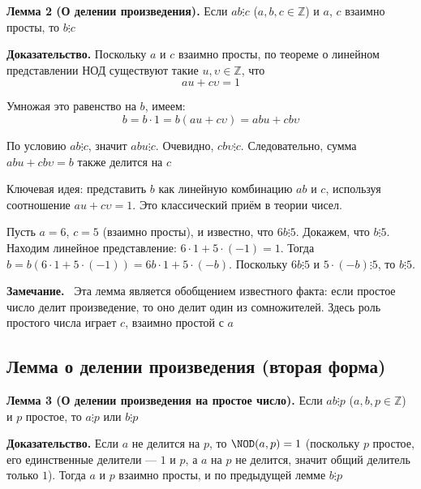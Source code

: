 \documentclass[a4paper,12pt]{article}
\newcommand{\myremark}{\textbf{Замечание.}\ }
\theoremstyle{definition}
\theoremstyle{plain}
\theoremstyle{remark}
\begin{document}
	\noindent \textbf{Лемма 2 (О делении произведения).}
	Если $ab \vdots c$ ($a, b, c \in \mathbb{Z}$) и $a$, $c$ взаимно просты, то $b \vdots c$
	
	\medskip
	\noindent \textbf{Доказательство.}
	Поскольку $a$ и $c$ взаимно просты, по теореме о линейном представлении НОД существуют такие $u, \upsilon \in \mathbb{Z}$, что
	\[
	au + c\upsilon = 1
	\]
	
	Умножая это равенство на $b$, имеем:
	\[
	b = b \cdot 1 = b(au + c\upsilon) = abu + cb\upsilon
	\]
	
	По условию $ab \vdots c$, значит $abu \vdots c$. Очевидно, $cb\upsilon \vdots c$. Следовательно, сумма $abu + cb\upsilon = b$ также делится на $c$
	
	\begin{tcolorbox}[colback=green!5, colframe=green!50!black, title=Пояснение]
	Ключевая идея: представить $b$ как линейную комбинацию $ab$ и $c$, используя соотношение $au + c\upsilon = 1$. Это классический приём в теории чисел.
	\end{tcolorbox}
	
	\begin{tcolorbox}[colback=gray!5, colframe=gray!50, title=Пример]
	Пусть $a = 6$, $c = 5$ (взаимно просты), и известно, что $6b \vdots 5$. Докажем, что $b \vdots 5$.
	Находим линейное представление: $6 \cdot 1 + 5 \cdot (-1) = 1$.
	Тогда $b = b(6 \cdot 1 + 5 \cdot (-1)) = 6b \cdot 1 + 5 \cdot (-b)$.
	Поскольку $6b \vdots 5$ и $5 \cdot (-b) \vdots 5$, то $b \vdots 5$.
	\end{tcolorbox}
	
	\myremark
	Эта лемма является обобщением известного факта: если простое число делит произведение, то оно делит один из сомножителей. Здесь роль простого числа играет $c$, взаимно простой с $a$
	
	\subsection{Лемма о делении произведения (вторая форма)}
	
	\noindent \textbf{Лемма 3 (О делении произведения на простое число).}
	Если $ab \vdots p$ ($a, b, p \in \mathbb{Z}$) и $p$ простое, то $a \vdots p$ или $b \vdots p$
	
	\medskip
	\noindent \textbf{Доказательство.}
	Если $a$ не делится на $p$, то $\NOD(a, p) = 1$ (поскольку $p$ простое, его единственные делители — $1$ и $p$, а $a$ на $p$ не делится, значит общий делитель только $1$). Тогда $a$ и $p$ взаимно просты, и по предыдущей лемме $b \vdots p$
	
\end{document}
